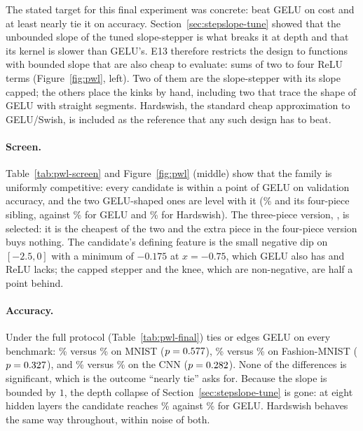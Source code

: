 \documentclass[11pt]{article}
\begin{document}
{The stated target for this final experiment was concrete: beat GELU on cost and at least nearly tie it
on accuracy. Section~\ref{sec:stepslope-tune} showed that the unbounded slope of the tuned
slope-stepper is what breaks it at depth and that its kernel is slower than GELU's. E13 therefore
restricts the design to functions with bounded slope that are also cheap to evaluate: sums of two to
four ReLU terms (Figure~\ref{fig:pwl}, left). Two of them are the slope-stepper with its slope capped;
the others place the kinks by hand, including two that trace the shape of GELU with straight
segments. Hardswish, the standard cheap approximation to GELU/Swish, is included as the reference that
any such design has to beat.

\paragraph{Screen.} Table~\ref{tab:pwl-screen} and Figure~\ref{fig:pwl} (middle) show that the family
is uniformly competitive: every candidate is within a point of GELU on validation accuracy, and the two
GELU-shaped ones are level with it (\pwlBestVal\% and its four-piece sibling, against \pwlGeluVal\% for
GELU and \pwlHardswishVal\% for Hardswish). The three-piece version, \pwlBest{}, is selected: it is the
cheapest of the two and the extra piece in the four-piece version buys nothing. The candidate's
defining feature is the small negative dip on $[-2.5,0]$ with a minimum of $-0.175$ at $x=-0.75$, which
GELU also has and ReLU lacks; the capped stepper and the knee, which are non-negative, are half a point
behind.

\paragraph{Accuracy.} Under the full protocol (Table~\ref{tab:pwl-final}) \pwlBest{} ties or edges
GELU on every benchmark: \pwlMnistBest\% versus \pwlMnistGelu\% on MNIST ($p=0.577$),
\pwlFashionBest\% versus \pwlFashionGelu\% on Fashion-MNIST ($p=0.327$), and
\pwlCnnBest\% versus \pwlCnnGelu\% on the CNN ($p=0.282$). None of the differences is
significant, which is the outcome ``nearly tie'' asks for. Because the slope is bounded by $1$, the
depth collapse of Section~\ref{sec:stepslope-tune} is gone: at eight hidden layers the candidate reaches
\pwlDepthBestEight\% against \pwlDepthGeluEight\% for GELU. Hardswish behaves the same way throughout,
within noise of both.

}
\end{document}
